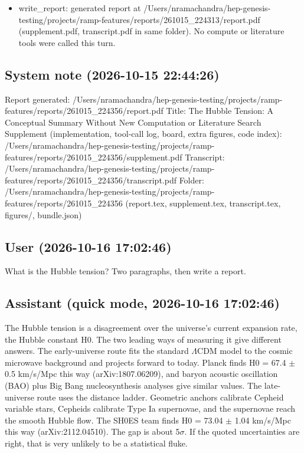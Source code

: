 \documentclass[11pt,a4paper]{article}
\begin{document}
\begin{itemize}
  \item write\_report: generated report at /Users/nramachandra/hep-genesis-testing/projects/ramp-features/reports/261015\_224313/report.pdf (supplement.pdf, transcript.pdf in same folder). No compute or literature tools were called this turn.
\end{itemize}
\subsection*{System note \small(2026-10-15 22:44:26)}
Report generated: /Users/nramachandra/hep-genesis-testing/projects/ramp-features/reports/261015\_224356/report.pdf Title: The Hubble Tension: A Conceptual Summary Without New Computation or Literature Search Supplement (implementation, tool-call log, board, extra figures, code index): /Users/nramachandra/hep-genesis-testing/projects/ramp-features/reports/261015\_224356/supplement.pdf Transcript: /Users/nramachandra/hep-genesis-testing/projects/ramp-features/reports/261015\_224356/transcript.pdf Folder: /Users/nramachandra/hep-genesis-testing/projects/ramp-features/reports/261015\_224356 (report.tex, supplement.tex, transcript.tex, figures/, bundle.json)

\subsection*{User \small(2026-10-16 17:02:46)}
What is the Hubble tension? Two paragraphs, then write a report.

\subsection*{Assistant \small(quick mode, 2026-10-16 17:02:46)}
The Hubble tension is a disagreement over the universe's current expansion rate, the Hubble constant H0. The two leading ways of measuring it give different answers. The early-universe route fits the standard $\Lambda$CDM model to the cosmic microwave background and projects forward to today. Planck finds H0 = 67.4 $\pm$ 0.5 km/s/Mpc this way (arXiv:1807.06209), and baryon acoustic oscillation (BAO) plus Big Bang nucleosynthesis analyses give similar values. The late-universe route uses the distance ladder. Geometric anchors calibrate Cepheid variable stars, Cepheids calibrate Type Ia supernovae, and the supernovae reach the smooth Hubble flow. The SH0ES team finds H0 = 73.04 $\pm$ 1.04 km/s/Mpc this way (arXiv:2112.04510). The gap is about 5$\sigma$. If the quoted uncertainties are right, that is very unlikely to be a statistical fluke.
\end{document}

